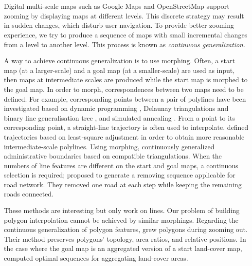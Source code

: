 \chapter[\BldgGrowToCTitle]{\BldgGrowTitle} 
\label{chap:Bldg}

\chaptermark{\BldgGrowChapterMark}

Digital multi-scale maps such as Google Maps and OpenStreetMap 
support zooming by displaying maps at different levels. 
This discrete strategy may result in sudden changes, 
which disturb user navigation.
To provide better zooming experience, 
we try to produce a sequence of maps 
with small incremental changes 
from a level to another level.
This process is known as \emph{continuous generalization}.

A way to achieve continuous generalization is to use morphing.
Often, a start map (at a larger-scale) and 
a goal map (at a smaller-scale) 
are used as input, 
then maps at intermediate scales are produced 
while the start map is morphed to the goal map.
In order to morph, correspondences 
between two maps need to be defined.
For example, corresponding points 
between a pair of polylines have been investigated based on 
dynamic programming \citep{Noellenburg2008}, 
Delaunay triangulations and 
binary line generalisation tree \citep{Deng2015},
and simulated annealing \citep{Li2017Annealing}.
From a point to its corresponding point,
a straight-line trajectory is often used to interpolate.
\citet{Peng2013LSA} defined trajectories 
based on least-square adjustment 
in order to obtain more reasonable intermediate-scale polylines.
Using morphing, \citet{Peng2016Admin} continuously generalized 
administrative boundaries based on compatible triangulations. 
When the numbers of line features are different 
on the start and goal maps, 
a continuous selection is required; 
\citet{Chimani2014Eat} proposed to generate a 
removing sequence applicable for road network.
They removed one road at each step
while keeping the remaining roads connected.

These methods are interesting but only work on lines. 
Our problem of building polygon interpolation 
cannot be achieved by similar morphings. 
Regarding the continuous generalization of polygon features,
\citet{Danciger2009} grew polygons during zooming out. 
Their method preserves polygons' 
topology, area-ratios, and relative positions.  
In the case where the goal map is an aggregated version of 
a start land-cover map, 
\citet{Peng2017AStar} computed optimal sequences 
for aggregating land-cover areas.

